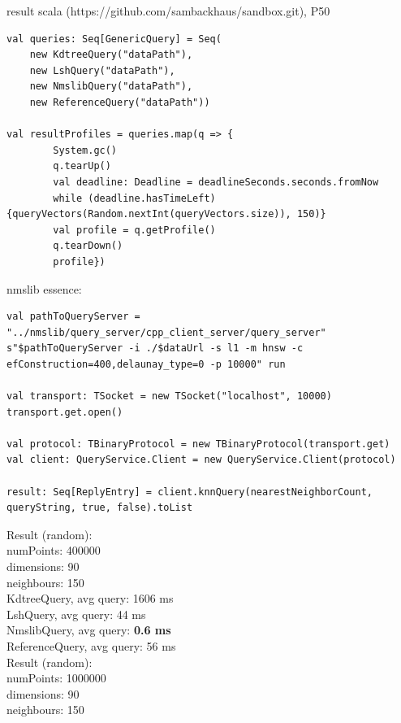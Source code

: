 \documentclass[xcolor=dvipsnames, aspectratio=1610]{beamer}
\newcommand{\alertA}[1]{\color{alertAcolor}#1\color{Black}}
\begin{document}
\begin{frame}[fragile]{result scala (https://github.com/sambackhaus/sandbox.git), P50} 
\linespread{1}\scriptsize{
\begin{minipage}{0.55\textwidth}  

\begin{lstlisting}[style=myScalastyle]
val queries: Seq[GenericQuery] = Seq(
	new KdtreeQuery("dataPath"),
	new LshQuery("dataPath"),
	new NmslibQuery("dataPath"),
	new ReferenceQuery("dataPath"))

val resultProfiles = queries.map(q => {
		System.gc()
		q.tearUp()
		val deadline: Deadline = deadlineSeconds.seconds.fromNow
		while (deadline.hasTimeLeft) {queryVectors(Random.nextInt(queryVectors.size)), 150)}
		val profile = q.getProfile()
		q.tearDown()
		profile})
\end{lstlisting}

nmslib essence:
\begin{lstlisting}[style=myScalastyle]
val pathToQueryServer = "../nmslib/query_server/cpp_client_server/query_server"
s"$pathToQueryServer -i ./$dataUrl -s l1 -m hnsw -c efConstruction=400,delaunay_type=0 -p 10000" run

val transport: TSocket = new TSocket("localhost", 10000)
transport.get.open()

val protocol: TBinaryProtocol = new TBinaryProtocol(transport.get)
val client: QueryService.Client = new QueryService.Client(protocol)

result: Seq[ReplyEntry] = client.knnQuery(nearestNeighborCount, queryString, true, false).toList
\end{lstlisting}

\end{minipage}
\hfill
\begin{minipage}{0.40\textwidth}  


\begin{flushleft}
Result (random):\\
numPoints: 400000\\
dimensions: 90\\
neighbours: 150\\

KdtreeQuery, avg query: 1606 ms\\
LshQuery, avg query: 44 ms\\
NmslibQuery, avg query: {\alertA{\bf{0.6 ms}}}\\
ReferenceQuery, avg query: 56 ms\\
\vspace{0.2cm}
Result (random):\\
numPoints: 1000000\\
dimensions: 90\\
neighbours: 150\\


\end{flushleft}
\end{minipage}}
\end{frame}
\end{document}
